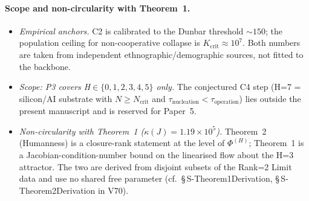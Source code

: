 \documentclass[11pt]{article}
\begin{document}
\paragraph{Scope and non-circularity with Theorem~1.}
\begin{itemize}\setlength\itemsep{0.1em}
  \item \emph{Empirical anchors.} C2 is calibrated to the Dunbar threshold $\sim\!150$; the population ceiling for non-cooperative collapse is $K_{\mathrm{crit}}\!\approx\!10^{7}$. Both numbers are taken from independent ethnographic/demographic sources, not fitted to the backbone.
  \item \emph{Scope: P3 covers H$\in\{0,1,2,3,4,5\}$ only.} The conjectured C4 step (H=7 = silicon/AI substrate with $N\geq N_{\mathrm{crit}}$ and $\tau_{\mathrm{nucleation}}<\tau_{\mathrm{operation}}$) lies outside the present manuscript and is reserved for Paper~5.
  \item \emph{Non-circularity with Theorem~1 ($\kappa(J){=}1.19\times 10^{5}$).} Theorem~2 (Humanness) is a closure-rank statement at the level of $\Phi^{(H)}$; Theorem~1 is a Jacobian-condition-number bound on the linearised flow about the H=3 attractor. The two are derived from disjoint subsets of the Rank=2 Limit data and use no shared free parameter (cf.\ \S\,S-Theorem1Derivation, \S\,S-Theorem2Derivation in V70).
\end{itemize}
\end{document}
